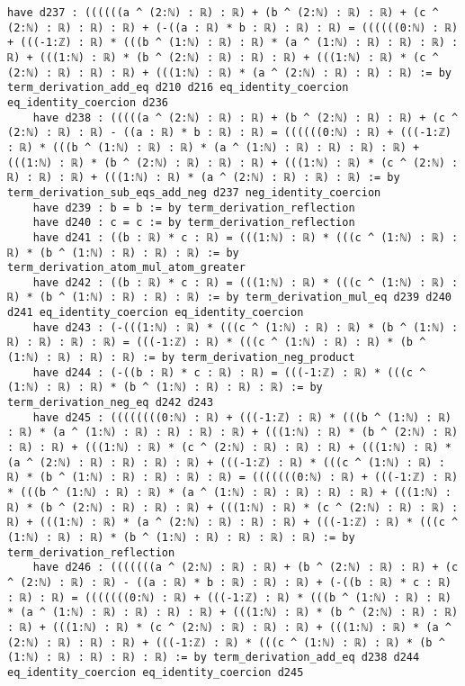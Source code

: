 \documentclass{article}
\begin{document}
\begin{tcolorbox}[colback=white!10, width=\linewidth]
\begin{lstlisting}[language=Lean4]
    have d237 : ((((((a ^ (2:ℕ) : ℝ) : ℝ) + (b ^ (2:ℕ) : ℝ) : ℝ) + (c ^ (2:ℕ) : ℝ) : ℝ) : ℝ) + (-((a : ℝ) * b : ℝ) : ℝ) : ℝ) = ((((((0:ℕ) : ℝ) + (((-1:ℤ) : ℝ) * (((b ^ (1:ℕ) : ℝ) : ℝ) * (a ^ (1:ℕ) : ℝ) : ℝ) : ℝ) : ℝ) + (((1:ℕ) : ℝ) * (b ^ (2:ℕ) : ℝ) : ℝ) : ℝ) + (((1:ℕ) : ℝ) * (c ^ (2:ℕ) : ℝ) : ℝ) : ℝ) + (((1:ℕ) : ℝ) * (a ^ (2:ℕ) : ℝ) : ℝ) : ℝ) := by term_derivation_add_eq d210 d216 eq_identity_coercion eq_identity_coercion d236
    have d238 : (((((a ^ (2:ℕ) : ℝ) : ℝ) + (b ^ (2:ℕ) : ℝ) : ℝ) + (c ^ (2:ℕ) : ℝ) : ℝ) - ((a : ℝ) * b : ℝ) : ℝ) = ((((((0:ℕ) : ℝ) + (((-1:ℤ) : ℝ) * (((b ^ (1:ℕ) : ℝ) : ℝ) * (a ^ (1:ℕ) : ℝ) : ℝ) : ℝ) : ℝ) + (((1:ℕ) : ℝ) * (b ^ (2:ℕ) : ℝ) : ℝ) : ℝ) + (((1:ℕ) : ℝ) * (c ^ (2:ℕ) : ℝ) : ℝ) : ℝ) + (((1:ℕ) : ℝ) * (a ^ (2:ℕ) : ℝ) : ℝ) : ℝ) := by term_derivation_sub_eqs_add_neg d237 neg_identity_coercion
    have d239 : b = b := by term_derivation_reflection
    have d240 : c = c := by term_derivation_reflection
    have d241 : ((b : ℝ) * c : ℝ) = (((1:ℕ) : ℝ) * (((c ^ (1:ℕ) : ℝ) : ℝ) * (b ^ (1:ℕ) : ℝ) : ℝ) : ℝ) := by term_derivation_atom_mul_atom_greater
    have d242 : ((b : ℝ) * c : ℝ) = (((1:ℕ) : ℝ) * (((c ^ (1:ℕ) : ℝ) : ℝ) * (b ^ (1:ℕ) : ℝ) : ℝ) : ℝ) := by term_derivation_mul_eq d239 d240 d241 eq_identity_coercion eq_identity_coercion
    have d243 : (-(((1:ℕ) : ℝ) * (((c ^ (1:ℕ) : ℝ) : ℝ) * (b ^ (1:ℕ) : ℝ) : ℝ) : ℝ) : ℝ) = (((-1:ℤ) : ℝ) * (((c ^ (1:ℕ) : ℝ) : ℝ) * (b ^ (1:ℕ) : ℝ) : ℝ) : ℝ) := by term_derivation_neg_product
    have d244 : (-((b : ℝ) * c : ℝ) : ℝ) = (((-1:ℤ) : ℝ) * (((c ^ (1:ℕ) : ℝ) : ℝ) * (b ^ (1:ℕ) : ℝ) : ℝ) : ℝ) := by term_derivation_neg_eq d242 d243
    have d245 : ((((((((0:ℕ) : ℝ) + (((-1:ℤ) : ℝ) * (((b ^ (1:ℕ) : ℝ) : ℝ) * (a ^ (1:ℕ) : ℝ) : ℝ) : ℝ) : ℝ) + (((1:ℕ) : ℝ) * (b ^ (2:ℕ) : ℝ) : ℝ) : ℝ) + (((1:ℕ) : ℝ) * (c ^ (2:ℕ) : ℝ) : ℝ) : ℝ) + (((1:ℕ) : ℝ) * (a ^ (2:ℕ) : ℝ) : ℝ) : ℝ) : ℝ) + (((-1:ℤ) : ℝ) * (((c ^ (1:ℕ) : ℝ) : ℝ) * (b ^ (1:ℕ) : ℝ) : ℝ) : ℝ) : ℝ) = (((((((0:ℕ) : ℝ) + (((-1:ℤ) : ℝ) * (((b ^ (1:ℕ) : ℝ) : ℝ) * (a ^ (1:ℕ) : ℝ) : ℝ) : ℝ) : ℝ) + (((1:ℕ) : ℝ) * (b ^ (2:ℕ) : ℝ) : ℝ) : ℝ) + (((1:ℕ) : ℝ) * (c ^ (2:ℕ) : ℝ) : ℝ) : ℝ) + (((1:ℕ) : ℝ) * (a ^ (2:ℕ) : ℝ) : ℝ) : ℝ) + (((-1:ℤ) : ℝ) * (((c ^ (1:ℕ) : ℝ) : ℝ) * (b ^ (1:ℕ) : ℝ) : ℝ) : ℝ) : ℝ) := by term_derivation_reflection
    have d246 : (((((((a ^ (2:ℕ) : ℝ) : ℝ) + (b ^ (2:ℕ) : ℝ) : ℝ) + (c ^ (2:ℕ) : ℝ) : ℝ) - ((a : ℝ) * b : ℝ) : ℝ) : ℝ) + (-((b : ℝ) * c : ℝ) : ℝ) : ℝ) = (((((((0:ℕ) : ℝ) + (((-1:ℤ) : ℝ) * (((b ^ (1:ℕ) : ℝ) : ℝ) * (a ^ (1:ℕ) : ℝ) : ℝ) : ℝ) : ℝ) + (((1:ℕ) : ℝ) * (b ^ (2:ℕ) : ℝ) : ℝ) : ℝ) + (((1:ℕ) : ℝ) * (c ^ (2:ℕ) : ℝ) : ℝ) : ℝ) + (((1:ℕ) : ℝ) * (a ^ (2:ℕ) : ℝ) : ℝ) : ℝ) + (((-1:ℤ) : ℝ) * (((c ^ (1:ℕ) : ℝ) : ℝ) * (b ^ (1:ℕ) : ℝ) : ℝ) : ℝ) : ℝ) := by term_derivation_add_eq d238 d244 eq_identity_coercion eq_identity_coercion d245

\end{lstlisting}
\end{tcolorbox}
\end{document}
